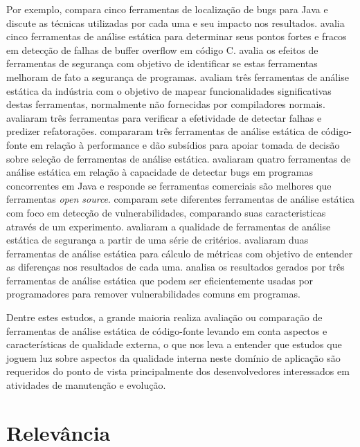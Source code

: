 Por exemplo,  compara cinco ferramentas de localização
de bugs para Java e discute as técnicas utilizadas por cada uma e seu impacto
nos resultados.  avalia cinco ferramentas de
análise estática para determinar seus pontos fortes e fracos em detecção de
falhas de buffer overflow em código C.  avalia os efeitos
de ferramentas de segurança com objetivo de identificar se estas ferramentas
melhoram de fato a segurança de programas. 
avaliam três ferramentas de análise estática da indústria com o objetivo de
mapear funcionalidades significativas destas ferramentas, normalmente não
fornecidas por compiladores normais.  avaliaram três
ferramentas para verificar a efetividade de detectar falhas e predizer
refatorações.  compararam três ferramentas de análise
estática de código-fonte em relação à performance e dão subsídios para apoiar
tomada de decisão sobre seleção de ferramentas de análise estática.
 avaliaram quatro ferramentas de análise estática em
relação à capacidade de detectar bugs em programas concorrentes em Java e
responde se ferramentas comerciais são melhores que ferramentas {\it open
source}.  comparam sete diferentes ferramentas de análise
estática com foco em detecção de vulnerabilidades, comparando suas
caracteristicas através de um experimento.  avaliaram a
qualidade de ferramentas de análise estática de segurança a partir de uma
série de critérios.  avaliaram duas ferramentas de
análise estática para cálculo de métricas com objetivo de entender as
diferenças nos resultados de cada uma.  analisa os
resultados gerados por três ferramentas de análise estática que podem ser
eficientemente usadas por programadores para remover vulnerabilidades comuns
em programas.

Dentre estes estudos, a grande maioria realiza avaliação ou comparação de
ferramentas de análise estática de código-fonte levando em conta aspectos e
características de qualidade externa, o que nos leva a entender que estudos
que joguem luz sobre aspectos da qualidade interna neste domínio de aplicação
são requeridos do ponto de vista principalmente dos desenvolvedores
interessados em atividades de manutenção e evolução.

\section{Relevância}

